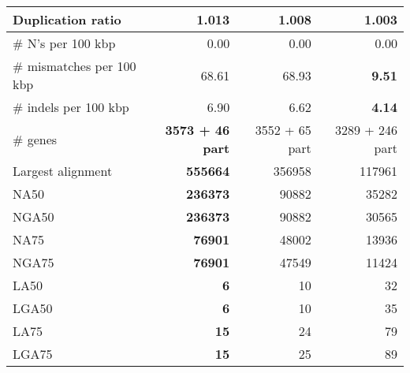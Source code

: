 \documentclass[12pt,a4paper]{article}
\begin{document}
\begin{table}[ht]
\begin{center}
\begin{tabular}{|l*{3}{|r}|}
Duplication ratio & 1.013 & 1.008 & {\bf 1.003} \\ \hline
\# N's per 100 kbp & 0.00 & 0.00 & 0.00 \\ \hline
\# mismatches per 100 kbp & 68.61 & 68.93 & {\bf 9.51} \\ \hline
\# indels per 100 kbp & 6.90 & 6.62 & {\bf 4.14} \\ \hline
\# genes & {\bf 3573 + 46 part} & 3552 + 65 part & 3289 + 246 part \\ \hline
Largest alignment & {\bf 555664} & 356958 & 117961 \\ \hline
NA50 & {\bf 236373} & 90882 & 35282 \\ \hline
NGA50 & {\bf 236373} & 90882 & 30565 \\ \hline
NA75 & {\bf 76901} & 48002 & 13936 \\ \hline
NGA75 & {\bf 76901} & 47549 & 11424 \\ \hline
LA50 & {\bf 6} & 10 & 32 \\ \hline
LGA50 & {\bf 6} & 10 & 35 \\ \hline
LA75 & {\bf 15} & 24 & 79 \\ \hline
LGA75 & {\bf 15} & 25 & 89 \\ \hline
\end{tabular}
\end{center}
\end{table}
\end{document}
